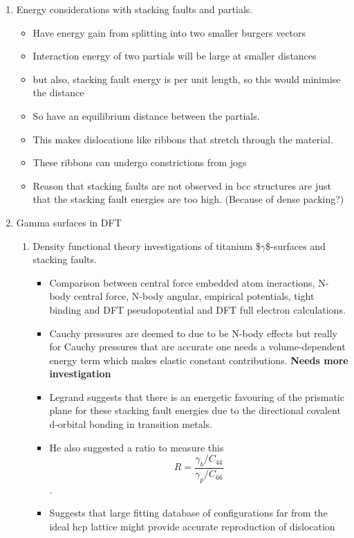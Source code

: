 \documentclass[11pt]{article}
\begin{document}
\begin{enumerate}
\item Energy considerations with stacking faults and partials.
\label{sec:orgb241e52}
\begin{itemize}
\item Have energy gain from splitting into two smaller burgers vectors
\item Interaction energy of two partials will be large at smaller distances
\item but also, stacking fault energy is per unit length, so this would
minimise the distance
\item So have an equilibrium distance between the partials.
\item This makes dislocations like ribbons that stretch through the material.
\item These ribbons can undergo constrictions from jogs
\item Reason that stacking faults are not observed in bcc structures are just
that the stacking fault energies are too high. (Because of dense packing?)
\end{itemize}
\item Gamma surfaces in DFT
\label{sec:orgb21fd66}
\begin{enumerate}
\item{} \cite{Benoit_2012} Density functional theory investigations of titanium \$\(\gamma\)\$-surfaces and stacking faults.
\label{sec:orgc5a895e}
\begin{itemize}
\item Comparison between central force  embedded atom ineractions, N-body
central force, N-body angular, empirical potentials, tight binding and
DFT pseudopotential and DFT full electron calculations.
\item Cauchy pressures are deemed to due to be N-body effects but really for Cauchy
pressures that are accurate one needs a volume-dependent energy term
which makes elastic constant contributions. \textbf{\textbf{Needs more investigation}}
\item Legrand suggests that there is an energetic favouring of the prismatic
plane for these stacking fault energies due to the directional covalent
d-orbital bonding in transition metals.
\item He also suggested a ratio to measure this \[ R = \frac{\gamma_{b}/C_{44}}{\gamma_{p}/C_{66}} \].
\item Suggests that large fitting database of configurations far from the
ideal hcp lattice might provide accurate reproduction of dislocation

\end{itemize}
\end{enumerate}
\end{enumerate}
\end{document}
